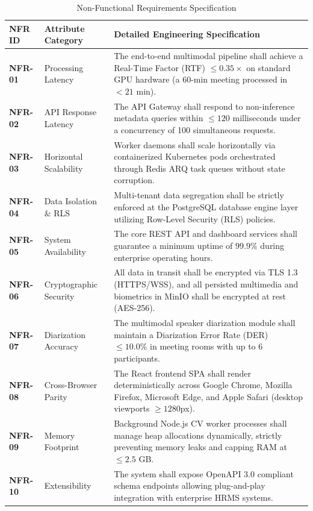\documentclass[12pt,a4paper,oneside]{report}
\begin{document}
\begin{table}[htbp]
\centering
\caption{Non-Functional Requirements Specification}
\label{tab:nonfunctional_reqs}
\fontsize{9}{11}\selectfont
\begin{tabularx}{\textwidth}{@{}l p{3.2cm} X@{}}
\toprule
\textbf{NFR ID} & \textbf{Attribute Category} & \textbf{Detailed Engineering Specification} \\
\midrule
\textbf{NFR-01} & Processing Latency & The end-to-end multimodal pipeline shall achieve a Real-Time Factor (RTF) $\le 0.35\times$ on standard GPU hardware (a 60-min meeting processed in $<21$ min). \\
\textbf{NFR-02} & API Response Latency & The API Gateway shall respond to non-inference metadata queries within $\le 120$ milliseconds under a concurrency of 100 simultaneous requests. \\
\textbf{NFR-03} & Horizontal Scalability & Worker daemons shall scale horizontally via containerized Kubernetes pods orchestrated through Redis ARQ task queues without state corruption. \\
\textbf{NFR-04} & Data Isolation \& RLS & Multi-tenant data segregation shall be strictly enforced at the PostgreSQL database engine layer utilizing Row-Level Security (RLS) policies. \\
\textbf{NFR-05} & System Availability & The core REST API and dashboard services shall guarantee a minimum uptime of $99.9\%$ during enterprise operating hours. \\
\textbf{NFR-06} & Cryptographic Security & All data in transit shall be encrypted via TLS 1.3 (HTTPS/WSS), and all persisted multimedia and biometrics in MinIO shall be encrypted at rest (AES-256). \\
\textbf{NFR-07} & Diarization Accuracy & The multimodal speaker diarization module shall maintain a Diarization Error Rate (DER) $\le 10.0\%$ in meeting rooms with up to 6 participants. \\
\textbf{NFR-08} & Cross-Browser Parity & The React frontend SPA shall render deterministically across Google Chrome, Mozilla Firefox, Microsoft Edge, and Apple Safari (desktop viewports $\ge 1280$px). \\
\textbf{NFR-09} & Memory Footprint & Background Node.js CV worker processes shall manage heap allocations dynamically, strictly preventing memory leaks and capping RAM at $\le 2.5$ GB. \\
\textbf{NFR-10} & Extensibility & The system shall expose OpenAPI 3.0 compliant schema endpoints allowing plug-and-play integration with enterprise HRMS systems. \\
\bottomrule
\end{tabularx}
\end{table}
\end{document}
